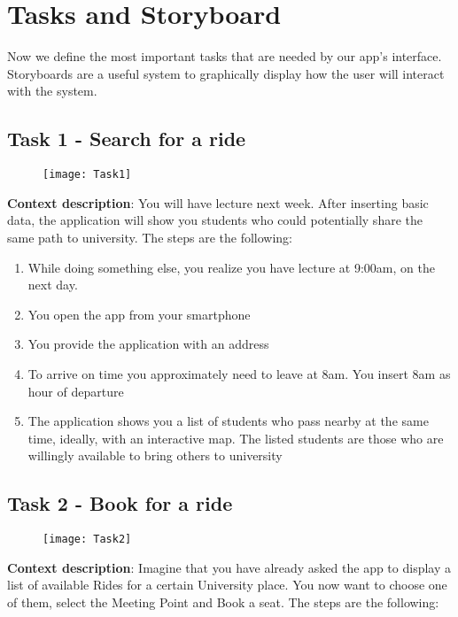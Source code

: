 \documentclass{article}
\begin{document}
\section{Tasks and Storyboard}
\graphicspath{{Doc images/Storyboards}}
Now we define the most important tasks that are needed by our app’s interface. Storyboards are a useful system to graphically display how the user will interact with the system.

\subsection{Task 1 - Search for a ride}

\begin{figure}[htbp]
  \centering
     \texttt{[image: Task1]}
\end{figure}

\textbf{Context description}: You will have lecture next week. After inserting basic data, the application will show you students who could potentially share the same path to university. The steps are the following:

\begin{enumerate}
    \item While doing something else, you realize you have lecture at 9:00am, on the next day. 
    \item You open the app from your smartphone 
    \item You provide the application with an address 
    \item To arrive on time you approximately need to leave at 8am. You insert 8am as hour of departure
    \item The application shows you a list of students who pass nearby at the same time, ideally, with an interactive map. The listed students are those who are willingly available to bring others to university
\end{enumerate}

\subsection{Task 2 - Book for a ride}

\begin{figure}[ht!]
  \centering
     \texttt{[image: Task2]}
\end{figure}


\textbf{Context description}: Imagine that you have already asked the app to display a list of available Rides for a certain University place. You now want to choose one of them, select the Meeting Point and Book a seat. The steps are the following:
\end{document}
